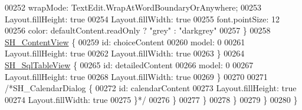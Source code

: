 \begin{DoxyCode}
00252                         wrapMode: TextEdit.WrapAtWordBoundaryOrAnywhere;
00253                         Layout.fillHeight: \textcolor{keyword}{true}
00254                         Layout.fillWidth: \textcolor{keyword}{true}
00255                         font.pointSize: 12
00256                         color: defaultContent.readOnly ? \textcolor{stringliteral}{"grey"} : \textcolor{stringliteral}{"darkgrey"}
00257                     \}
00258                     \hyperlink{classSH__ContentView}{SH\_ContentView} \{
00259                         \textcolor{keywordtype}{id}: choiceContent
00260                         model: 0
00261                         Layout.fillHeight: \textcolor{keyword}{true}
00262                         Layout.fillWidth: \textcolor{keyword}{true}
00263                     \}
00264                     \hyperlink{classSH__SqlTableView}{SH\_SqlTableView} \{
00265                         \textcolor{keywordtype}{id}: detailedContent
00266                         model: 0
00267                         Layout.fillHeight: \textcolor{keyword}{true}
00268                         Layout.fillWidth: \textcolor{keyword}{true}
00269                     \}
00270 
00271                     \textcolor{comment}{/*SH\_CalendarDialog \{}
00272 \textcolor{comment}{                        id: calendarContent}
00273 \textcolor{comment}{                        Layout.fillHeight: true}
00274 \textcolor{comment}{                        Layout.fillWidth: true}
00275 \textcolor{comment}{                    \}*/}
00276                 \}
00277             \}
00278         \}
00279     \}
00280 \}
\end{DoxyCode}
